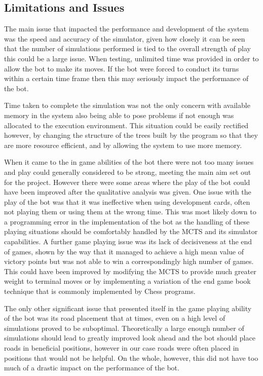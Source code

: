 \documentclass[]{article}
\begin{document}
\subsection{Limitations and Issues}
The main issue that impacted the performance and development of the system was the speed and accuracy of the simulator, given how closely it can be seen that the number of simulations performed is tied to the overall strength of play this could be a large issue. When testing, unlimited time was provided in order to allow the bot to make its moves. If the bot were forced to conduct its turns within a certain time frame then this may seriously impact the performance of the bot. 

\par Time taken to complete the simulation was not the only concern with available memory in the system also being able to pose problems if not enough was allocated to the execution environment. This situation could be easily rectified however, by changing the structure of the trees built by the program so that they are more resource efficient, and by allowing the system to use more memory.

\par When it came to the in game abilities of the bot there were not too many issues and play could generally considered to be strong, meeting the main aim set out for the project. However there were some areas where the play of the bot could have been improved after the qualitative analysis was given. One issue with the play of the bot was that it was ineffective when using development cards, often not playing them or using them at the wrong time. This was most likely down to a programming error in the implementation of the bot as the handling of these playing situations should be comfortably handled by the MCTS and its simulator capabilities. A further game playing issue was its lack of decisiveness at the end of games, shown by the way that it managed to achieve a high mean value of victory points but was not able to win a correspondingly high number of games. This could have been improved by modifying the MCTS to provide much greater weight to terminal moves or by implementing a variation of the end game book technique that is commonly implemented by Chess programs.

\par The only other significant issue that presented itself in the game playing ability of the bot was its road placement that at times, even on a high level of simulations proved to be suboptimal. Theoretically a large enough number of simulations should lead to greatly improved look ahead and the bot should place roads in beneficial positions, however in our case roads were often placed in positions that would not be helpful. On the whole, however, this did not have too much of a drastic impact on the performance of the bot.
\end{document}
